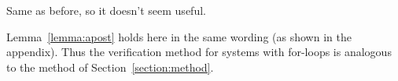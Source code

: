 Same as before, so it doesn't seem useful.

%
Lemma~\ref{lemma:apost} holds here in the same wording (as shown in
the appendix).
%
Thus the verification method for systems with for-loops is analogous
to the method of Section~\ref{section:method}.
